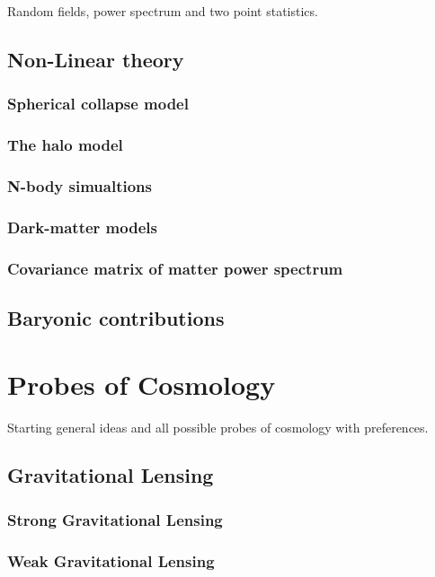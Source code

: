 Random fields, power spectrum and two point statistics.
\subsection{Non-Linear theory}
\subsubsection{Spherical collapse model}
\subsubsection{The halo model}
\subsubsection{N-body simualtions}
\subsubsection{Dark-matter models}
\subsubsection{Covariance matrix of matter power spectrum}
\subsection{Baryonic contributions}
\section{Probes of Cosmology}

Starting general ideas and all possible probes of cosmology with preferences.


\subsection{Gravitational Lensing}
\subsubsection{Strong Gravitational Lensing}
\subsubsection{Weak Gravitational Lensing}
